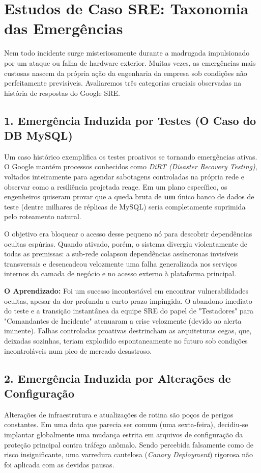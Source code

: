 \documentclass[12pt,a4paper,twoside]{report}
\begin{document}
\section{Estudos de Caso SRE: Taxonomia das Emergências}

Nem todo incidente surge misteriosamente durante a madrugada impulsionado por um ataque ou falha de hardware exterior. Muitas vezes, as emergências mais custosas nascem da própria ação da engenharia da empresa sob condições não perfeitamente previsíveis. Avaliaremos três categorias cruciais observadas na história de respostas do Google SRE.

\subsection{1. Emergência Induzida por Testes (O Caso do DB MySQL)}
Um caso histórico exemplifica os testes proativos se tornando emergências ativas. O Google mantém processos conhecidos como \textit{DiRT (Disaster Recovery Testing)}, voltados inteiramente para agendar sabotagens controladas na própria rede e observar como a resiliência projetada reage. Em um plano específico, os engenheiros quiseram provar que a queda bruta de \textbf{um} único banco de dados de teste (dentre milhares de réplicas de MySQL) seria completamente suprimida pelo roteamento natural.

O objetivo era bloquear o acesso desse pequeno nó para descobrir dependências ocultas espúrias. Quando ativado, porém, o sistema divergiu violentamente de todas as premissas: a sub-rede colapsou dependências assíncronas invisíveis transversais e desencadeou velozmente uma falha generalizada nos serviços internos da camada de negócio e no acesso externo à plataforma principal.

\textbf{O Aprendizado:} Foi um sucesso incontestável em encontrar vulnerabilidades ocultas, apesar da dor profunda a curto prazo impingida. O abandono imediato do teste e a transição instantânea da equipe SRE do papel de "Testadores" para "Comandantes de Incidente" atenuaram a crise velozmente (devido ao alerta iminente). Falhas controladas proativas destrincham as arquiteturas cegas, que, deixadas sozinhas, teriam explodido espontaneamente no futuro sob condições incontroláveis num pico de mercado desastroso.

\subsection{2. Emergência Induzida por Alterações de Configuração}
Alterações de infraestrutura e atualizações de rotina são poços de perigos constantes. Em uma data que parecia ser comum (uma sexta-feira), decidiu-se implantar globalmente uma mudança estrita em arquivos de configuração da proteção principal contra tráfego anômalo. Sendo percebida falsamente como de risco insignificante, uma varredura cautelosa (\textit{Canary Deployment}) rigorosa não foi aplicada com as devidas pausas.
\end{document}
